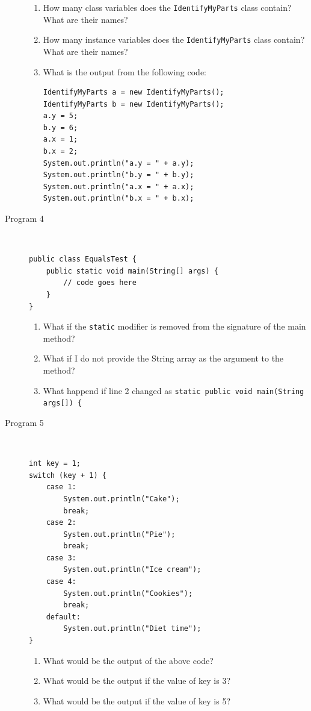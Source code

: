 \documentclass[11pt,a4paper]{article}
\def\AnswerBox{\fbox{\begin{minipage}{4in}\hfill\vspace{0.5in}\end{minipage}}}
\begin{document}
\begin{description}
\begin{enumerate}[label=\bfseries Q\arabic*:]\itemsep10pt
\item How many class variables does the \texttt{IdentifyMyParts} class contain? What are their names?

\item How many instance variables does the \texttt{IdentifyMyParts} class contain? What are their names?

\item What is the output from the following code:
\begin{verbatim}
IdentifyMyParts a = new IdentifyMyParts();
IdentifyMyParts b = new IdentifyMyParts();
a.y = 5;
b.y = 6;
a.x = 1;
b.x = 2;
System.out.println("a.y = " + a.y);
System.out.println("b.y = " + b.y);
System.out.println("a.x = " + a.x);
System.out.println("b.x = " + b.x);
\end{verbatim}
\end{enumerate}

\item [Program 4]\
\begin{lstlisting}
public class EqualsTest {
    public static void main(String[] args) {
        // code goes here
    }
}
\end{lstlisting}

\AnswerBox

\begin{enumerate}[label=\bfseries Q\arabic*:]\itemsep10pt
\item What if the \texttt{static} modifier is removed from the signature of the main method?
\item What if I do not provide the String array as the argument to the method?
\item What happend if line 2 changed as \texttt{static public void main(String args[]) \{ }
\end{enumerate}

\item [Program 5]\
\begin{lstlisting}
int key = 1;
switch (key + 1) {
    case 1:
        System.out.println("Cake");
        break;
    case 2:
        System.out.println("Pie");
        break;
    case 3:
        System.out.println("Ice cream");
    case 4:
        System.out.println("Cookies");
        break;
    default:
        System.out.println("Diet time");
}
\end{lstlisting}

\AnswerBox

\begin{enumerate}[label=\bfseries Q\arabic*:]\itemsep10pt
\item What would be the output of the above code?
\item What would be the output if the value of key is 3?
\item What would be the output if the value of key is 5?
\end{enumerate}


\end{description}
\end{document}
